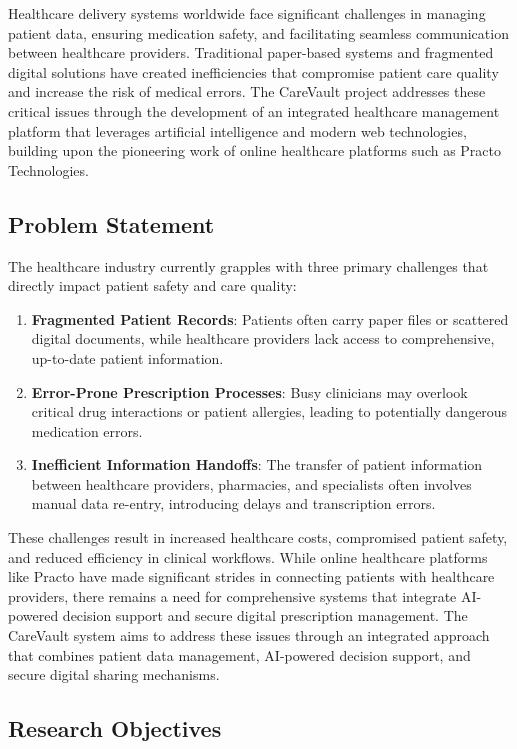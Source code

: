 \documentclass[12pt,a4paper]{article}
\begin{document}
Healthcare delivery systems worldwide face significant challenges in managing patient data, ensuring medication safety, and facilitating seamless communication between healthcare providers. Traditional paper-based systems and fragmented digital solutions have created inefficiencies that compromise patient care quality and increase the risk of medical errors. The CareVault project addresses these critical issues through the development of an integrated healthcare management platform that leverages artificial intelligence and modern web technologies, building upon the pioneering work of online healthcare platforms such as Practo Technologies.

\subsection{Problem Statement}

The healthcare industry currently grapples with three primary challenges that directly impact patient safety and care quality:

\begin{enumerate}
    \item \textbf{Fragmented Patient Records}: Patients often carry paper files or scattered digital documents, while healthcare providers lack access to comprehensive, up-to-date patient information.
    \item \textbf{Error-Prone Prescription Processes}: Busy clinicians may overlook critical drug interactions or patient allergies, leading to potentially dangerous medication errors.
    \item \textbf{Inefficient Information Handoffs}: The transfer of patient information between healthcare providers, pharmacies, and specialists often involves manual data re-entry, introducing delays and transcription errors.
\end{enumerate}

These challenges result in increased healthcare costs, compromised patient safety, and reduced efficiency in clinical workflows. While online healthcare platforms like Practo have made significant strides in connecting patients with healthcare providers, there remains a need for comprehensive systems that integrate AI-powered decision support and secure digital prescription management. The CareVault system aims to address these issues through an integrated approach that combines patient data management, AI-powered decision support, and secure digital sharing mechanisms.

\subsection{Research Objectives}
\end{document}
